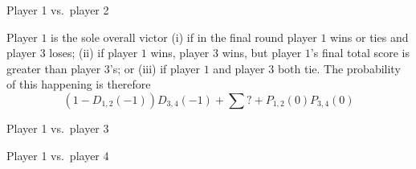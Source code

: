 \subhead Player 1 vs.~player 2 \endsubhead

Player $1$ is the sole overall victor
(i) if in the final round player $1$ wins or ties and player $3$ loses;
(ii) if player $1$ wins, player $3$ wins, but player $1$'s final
total score is greater than player $3$'s;
or (iii) if player $1$ and player $3$ both tie.
The probability of this happening is therefore
$$
(1-D_{1,2}(-1))D_{3,4}(-1)
+\sum ?
+ P_{1,2}(0) P_{3,4}(0)
$$

\subhead Player 1 vs.~player 3 \endsubhead

\subhead Player 1 vs.~player 4 \endsubhead


\enddocument
